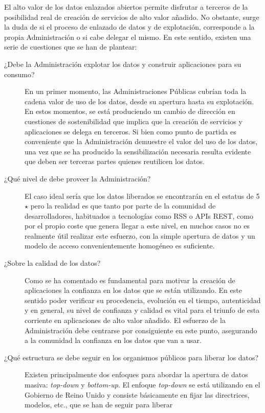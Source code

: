 El alto valor de los datos enlazados abiertos permite disfrutar a terceros de la posibilidad real 
de creación de servicios de alto valor añadido. No obstante, surge la duda de si el proceso de enlazado de datos
y de explotación, corresponde a la propia Administración o si cabe delegar el mismo. En este sentido, existen
una serie de cuestiones que se han de plantear:
\begin{description}
 \item [¿Debe la Administración explotar los datos y construir aplicaciones para su consumo?] En un primer momento, las Administraciones
Públicas cubrían toda la cadena valor de uso de los datos, desde su apertura hasta su explotación. En estos momentos, se está produciendo
un cambio de dirección en cuestiones de sostenibilidad que implica que la creación de servicios y aplicaciones se delega en terceros. Si bien
como punto de partida es conveniente que la Administración demuestre el valor del uso de los datos, una vez que se ha producido
la sensibilización necesaria resulta evidente que deben ser terceras partes quienes reutilicen los datos.
\item [¿Qué nivel de \linkeddata debe proveer la Administración?] El caso ideal sería que los datos liberados se encontrarán
en el estatus de 5 $\star$ pero la realidad es que tanto por parte de la comunidad de desarrolladores, habituados
a tecnologías como \gls{RSS} o APIs \gls{REST}, como por el propio coste
que genera llegar a este nivel, en muchos casos no es realmente útil realizar este esfuerzo, con la simple apertura de datos
y un modelo de acceso convenientemente homogéneo es suficiente.
\item [¿Sobre la calidad de los datos?] Como se ha comentado es fundamental para motivar la creación de aplicaciones
la confianza en los datos que se están utilizando. En este sentido poder verificar su procedencia, evolución en el tiempo, autenticidad
y en general, su nivel de confianza y calidad es vital para el triunfo de esta corriente en aplicaciones de alto valor añadido. El esfuerzo
de la Administración debe centrarse por consiguiente en este punto, asegurando a la comunidad la confianza en los datos
que van a usar.
\item [¿Qué estructura se debe seguir en los organismos públicos para liberar los datos?] Existen principalmente dos enfoques
para abordar la apertura de datos masiva: \textit{top-down} y \textit{bottom-up}. El enfoque \textit{top-down} se está
utilizando en el Gobierno de Reino Unido y consiste básicamente en fijar las directrices, modelos, etc., que se han de seguir para liberar

\end{description}
